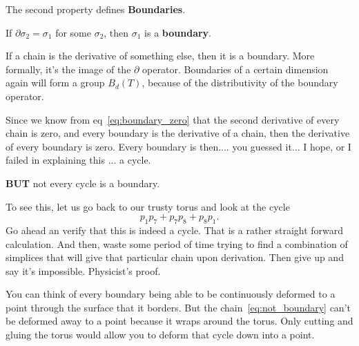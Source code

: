 The second property defines \textbf{Boundaries}.
\begin{definition}[Boundary]
  If $\partial \sigma_2 = \sigma_1$ for some $\sigma_2$, then $\sigma_1$ is a \textbf{boundary}.
\end{definition}
 If a chain is the derivative of something else, then it is a boundary.  More formally, it's the image of the $\partial$ operator.  Boundaries of a certain dimension again will form a group $B_d (T)$, because of the distributivity of the boundary operator.

Since we know from eq~\ref{eq:boundary_zero} that the second derivative of every chain is zero, and every boundary is the derivative of a chain, then the derivative of every boundary is zero. Every boundary is then.... you guessed it... I hope, or I failed in explaining this ... a cycle.

\textbf{BUT} not every cycle is a boundary.

To see this, let us go back to our trusty torus and look at the cycle
\begin{equation}\label{eq:not_boundary}
  p_1 p_7 + p_7 p_8 + p_8 p_1.
\end{equation}
Go ahead an verify that this is indeed a cycle.  That is a rather straight forward calculation.  And then, waste some period of time trying to find a combination of simplices that will give that particular chain upon derivation.  Then give up and say it's impossible.  Physicist's proof.

You can think of every boundary being able to be continuously deformed to a point through the surface that it borders. But the chain~\ref{eq:not_boundary} can't be deformed away to a point because it wraps around the torus.  Only cutting and gluing the torus would allow you to deform that cycle down into a point.

